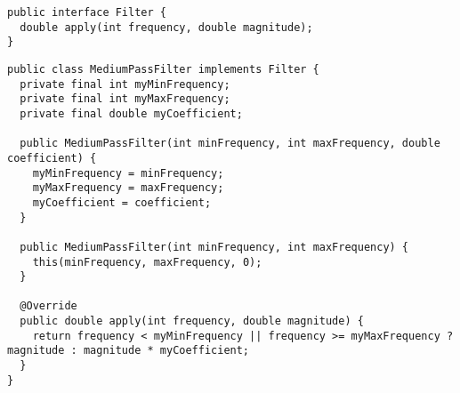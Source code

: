 \begin{lstlisting}[caption={Общий интерфейс фильтров}]
public interface Filter {
  double apply(int frequency, double magnitude);
}
\end{lstlisting}

\begin{lstlisting}[caption={Простейший среднечастотный фильтр}]
public class MediumPassFilter implements Filter {
  private final int myMinFrequency;
  private final int myMaxFrequency;
  private final double myCoefficient;

  public MediumPassFilter(int minFrequency, int maxFrequency, double coefficient) {
    myMinFrequency = minFrequency;
    myMaxFrequency = maxFrequency;
    myCoefficient = coefficient;
  }

  public MediumPassFilter(int minFrequency, int maxFrequency) {
    this(minFrequency, maxFrequency, 0);
  }

  @Override
  public double apply(int frequency, double magnitude) {
    return frequency < myMinFrequency || frequency >= myMaxFrequency ? magnitude : magnitude * myCoefficient;
  }
}
\end{lstlisting}
